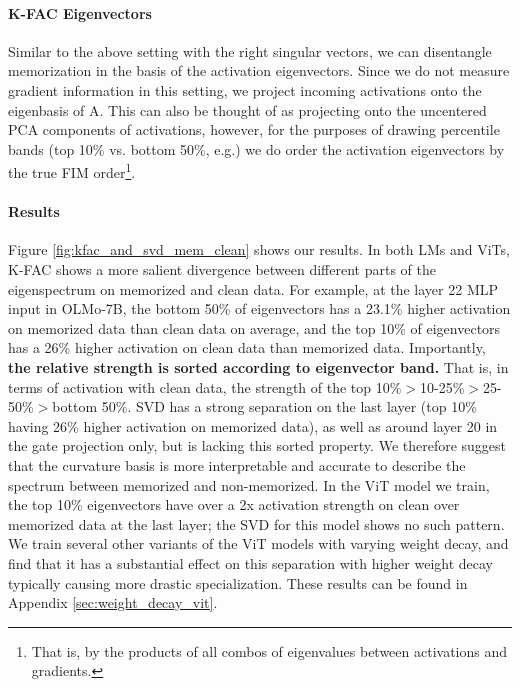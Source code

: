 \documentclass{article} %
\newcommand{\matr}[1]{\ensuremath{\bm{\mathrm{#1}}}}
\begin{document}
\paragraph{K-FAC Eigenvectors} Similar to the above setting with the right singular vectors, we can disentangle memorization in the basis of the activation eigenvectors. Since we do not measure gradient information in this setting, we project incoming activations onto the eigenbasis of \matr{A}. This can also be thought of as projecting onto the uncentered PCA components of activations, however, for the purposes of drawing percentile bands (top 10\% vs. bottom 50\%, e.g.) we do order the activation eigenvectors by the true FIM order\footnote{That is, by the products of all combos of eigenvalues between activations and gradients.}.
\paragraph{Results} Figure \ref{fig:kfac_and_svd_mem_clean} shows our results. In both LMs and ViTs, K-FAC shows a more salient divergence between different parts of the eigenspectrum on memorized and clean data. For example, at the layer 22 MLP input in OLMo-7B, the bottom 50\% of eigenvectors has a 23.1\% higher activation on memorized data than clean data on average, and the top 10\% of eigenvectors has a 26\% higher activation on clean data than memorized data. Importantly, \textbf{the relative strength is sorted according to eigenvector band.} That is, in terms of activation with clean data, the strength of the top 10\%$>$10-25\%$>$25-50\%$>$bottom 50\%. SVD has a strong separation on the last layer (top 10\% having 26\% higher activation on memorized data), as well as around layer 20 in the gate projection only, but is lacking this sorted property. We therefore suggest that the curvature basis is more interpretable and accurate to describe the spectrum between memorized and non-memorized. In the ViT model we train, the top 10\% eigenvectors have over a 2x activation strength on clean over memorized data at the last layer; the SVD for this model shows no such pattern. We train several other variants of the ViT models with varying weight decay, and find that it has a substantial effect on this separation with higher weight decay typically causing more drastic specialization. These results can be found in Appendix \ref{sec:weight_decay_vit}.
\end{document}
